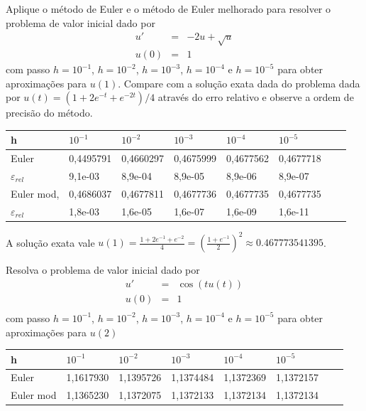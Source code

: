 \begin{exer}Aplique o método de Euler e o método de Euler melhorado para resolver o problema de valor inicial dado por
\begin{eqnarray}
u'&=& -2u + \sqrt{u}\\
u(0)&=&1
\end{eqnarray}
com passo $h=10^{-1}$, $h=10^{-2}$, $h=10^{-3}$, $h=10^{-4}$ e $h=10^{-5}$ para obter aproximações para $u(1)$. Compare com a solução exata dada do problema dada por $u(t) =  \left({1+2 e^{-t}+e^{-2 t}}\right)/{4}$ através do erro relativo e observe a ordem de precisão do método.
\end{exer}
\begin{resp}

\begin{center}
 \begin{tabular}{|l|l|l|l|l|l|l|l|}%
\hline
   h&$10^{-1}$&$10^{-2}$&$10^{-3}$&$10^{-4}$&$10^{-5}$\\
   \hline
   Euler & 0,4495791 & 0,4660297 & 0,4675999 & 0,4677562 & 0,4677718\\
   \hline
   $\varepsilon_{rel}$ &9,1e-03 &  8,9e-04  & 8,9e-05&   8,9e-06 &  8,9e-07\\
   \hline
  Euler mod, & 0,4686037 & 0,4677811 & 0,4677736 & 0,4677735 & 0,4677735\\
   \hline
   $\varepsilon_{rel}$ & 1,8e-03 & 1,6e-05 & 1,6e-07 & 1,6e-09 & 1,6e-11\\
   \hline
   \end{tabular}
\end{center}
A solução exata vale $u(1)=\frac{1+2e^{-1}+e^{-2}}{4}= \left(\frac{1+e^{-1}}{2}\right)^2\approx 0.467773541395$.
\end{resp}


\begin{exer}Resolva o problema de valor inicial dado por
\begin{eqnarray}
u'&=& \cos(tu(t))\\
u(0)&=&1\\
\end{eqnarray}
com passo $h=10^{-1}$, $h=10^{-2}$, $h=10^{-3}$, $h=10^{-4}$ e $h=10^{-5}$ para obter aproximações para $u(2)$
\end{exer}
\begin{resp}
\begin{center}
 \begin{tabular}{|l|l|l|l|l|l|l|l|}%
\hline
   h&$10^{-1}$&$10^{-2}$&$10^{-3}$&$10^{-4}$&$10^{-5}$\\
   \hline
   Euler & 1,1617930 & 1,1395726 & 1,1374484 & 1,1372369 & 1,1372157\\
   \hline
  Euler mod & 1,1365230 & 1,1372075 & 1,1372133 & 1,1372134 & 1,1372134\\
   \hline
   \end{tabular}
\end{center}
\end{resp}





